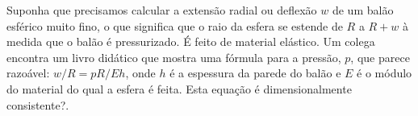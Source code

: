 Suponha que precisamos calcular a extensão radial ou deflexão $w$ de um balão esférico muito fino, o que significa que o raio da esfera se estende de $R$ a $R + w$ à medida que o balão é pressurizado. É feito de material elástico. Um colega encontra um livro didático que mostra uma fórmula para a pressão, $p$, que parece razoável: $w/R = pR/Eh$, onde $h$ é a espessura da parede do balão e $E$ é o módulo do material do qual a esfera é feita. Esta equação é dimensionalmente consistente?.

